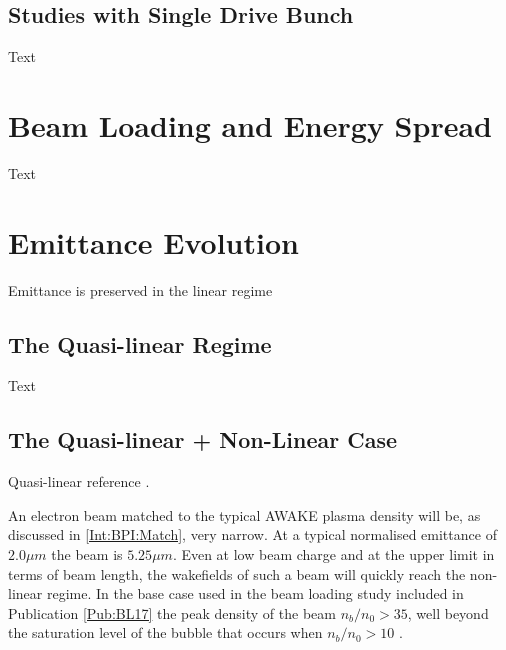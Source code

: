 \subsection{Studies with Single Drive Bunch}
\label{Sim:PBSingle}

Text


\section{Beam Loading and Energy Spread}
\label{Sim:BLoad}

Text


\section{Emittance Evolution}
\label{Sim:Emitt}

Emittance is preserved in the linear regime


\subsection{The Quasi-linear Regime}
\label{Sim:QLin}

Text


\subsection{The Quasi-linear + Non-Linear Case}
\label{Sim:QLinNonLin}

Quasi-linear reference \cite{rosenzweig:2010}.

An electron beam matched to the typical AWAKE plasma density will be, as discussed in \ref{Int:BPI:Match}, very narrow. At a typical normalised emittance of $2.0\unit{\mu m}$ the beam is $5.25\unit{\mu m}$. Even at low beam charge and at the upper limit in terms of beam length, the wakefields of such a beam will quickly reach the non-linear regime. In the base case used in the beam loading study included in Publication \ref{Pub:BL17} \cite{berglyd_olsen:2018} the peak density of the beam $n_b/n_0 > 35$, well beyond the saturation level of the bubble that occurs when $n_b/n_0 > 10$ \cite{lu:2005}.

